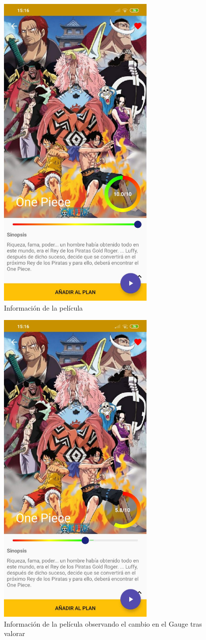 \begin{figure}[H]
    \centering
    \includegraphics[width=3in]{figures/infoFilm1.jpg}
    \caption{Información de la película}
\end{figure}
\begin{figure}[H]
    \centering
    \includegraphics[width=3in]{figures/infoFilm2.jpg}
    \caption{Información de la película observando el cambio en el Gauge tras valorar}
\end{figure}
